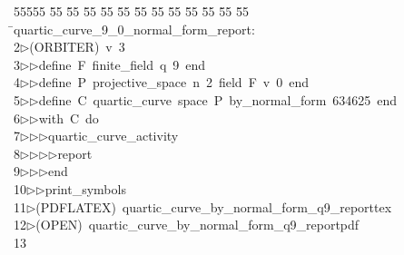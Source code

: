 %
%
\begin{tabbing}
55555 \= 55 \= 55 \= 55 \= 55 \= 55 \= 55 \= 55 \= 55 \= 55 \= 55 \= 55 \= 55 \= \>quartic\_curve\_9\_0\_normal\_form\_report:\\[0pt]
2\>$\triangleright$\>(ORBITER)\ v\ 3\ \\[0pt]
3\>$\triangleright$\>$\triangleright$\>define\ F\ finite\_field\ q\ 9\ end\ \\[0pt]
4\>$\triangleright$\>$\triangleright$\>define\ P\ projective\_space\ n\ 2\ field\ F\ v\ 0\ end\ \\[0pt]
5\>$\triangleright$\>$\triangleright$\>define\ C\ quartic\_curve\ space\ P\ by\_normal\_form\ 634625\ end\ \\[0pt]
6\>$\triangleright$\>$\triangleright$\>with\ C\ do\ \\[0pt]
7\>$\triangleright$\>$\triangleright$\>$\triangleright$\>quartic\_curve\_activity\ \\[0pt]
8\>$\triangleright$\>$\triangleright$\>$\triangleright$\>$\triangleright$\>report\ \\[0pt]
9\>$\triangleright$\>$\triangleright$\>$\triangleright$\>end\ \\[0pt]
10\>$\triangleright$\>$\triangleright$\>print\_symbols\\[0pt]
11\>$\triangleright$\>(PDFLATEX)\ quartic\_curve\_by\_normal\_form\_q9\_reporttex\\[0pt]
12\>$\triangleright$\>(OPEN)\ quartic\_curve\_by\_normal\_form\_q9\_reportpdf\\[0pt]
13\>\end{tabbing}
